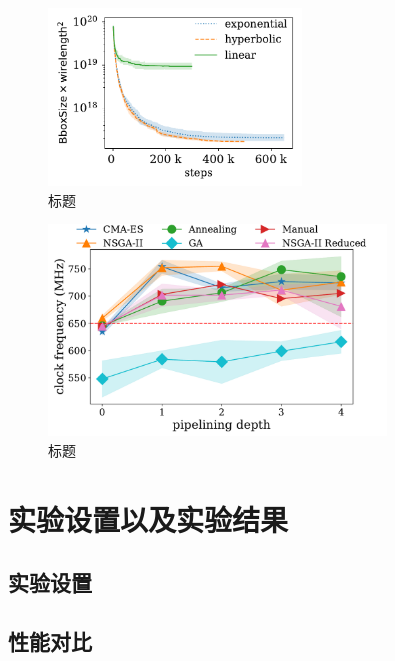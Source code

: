 \begin{figure}[h]
	\centering
	\includegraphics[width=0.6\textwidth]{figure/Annealing-Tuning}
	\caption{标题} 
	\label{fig:objective}
\end{figure}

\begin{figure}[h]
	\centering
	\includegraphics[width=0.8\textwidth]{figure/frequency_depth}
	\caption{标题} 
	\label{fig:objective}
\end{figure}





\section{实验设置以及实验结果}



\subsection{实验设置}


\subsection{性能对比}

